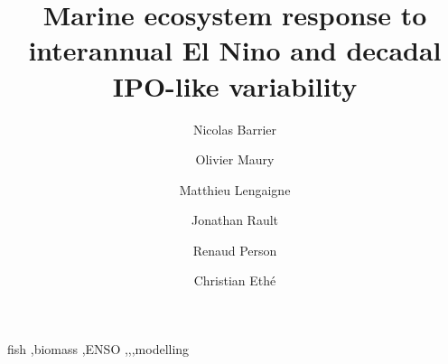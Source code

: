 \documentclass[review, 12pt]{elsarticle}
\begin{document}
\begin{frontmatter}

\title{Marine ecosystem response to interannual El Nino and decadal IPO-like variability}

\author[mymainaddress]{Nicolas Barrier}

\author[mymainaddress]{Olivier Maury}
\author[mymainaddress]{Matthieu Lengaigne}
\author[mymainaddress]{Jonathan Rault}
\author[renaud]{Renaud Person}
\author[chris]{Christian Eth\'{e}}


\address[mymainaddress]{MARBEC, Univ. Montpellier, CNRS, Ifremer, IRD, Sète, France}
\address[renaud]{LOCEAN, IRD}
\address[chris]{IPSL, CNRS}

\begin{abstract}

\end{abstract}

\begin{keyword}
fish \sep biomass \sep ENSO \sep \nino \sep \nina \sep modelling
\end{keyword}

\end{frontmatter}

\linenumbers

%
%
\newpage





%
\end{document}
